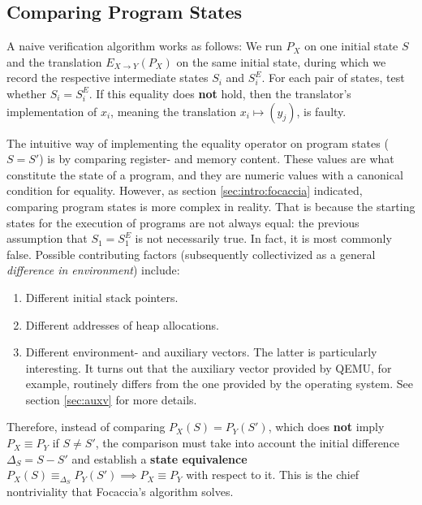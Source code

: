 \subsection{Comparing Program States}\label{sec:comparison}

A naive verification algorithm works as follows: We run $P_X$ on one initial state $S$ and the translation $E_{X
\rightarrow Y}(P_X)$ on the same initial state, during which we record the respective intermediate states $S_i$ and
$S^E_i$. For each pair of states, test whether $S_i = S^E_i$. If this equality does \textbf{not} hold, then the
translator's implementation of $x_i$, meaning the translation $x_i \mapsto (y_j)$, is faulty.

The intuitive way of implementing the equality operator on program states ($S = S'$) is by comparing register- and
memory content. These values are what constitute the state of a program, and they are numeric values with a canonical
condition for equality. However, as section \ref{sec:intro:focaccia} indicated, comparing program states is more complex
in reality. That is because the starting states for the execution of programs are not always equal: the previous
assumption that $S_1 = S^E_1$ is not necessarily true. In fact, it is most commonly false. Possible contributing factors
(subsequently collectivized as a general \textit{difference in environment}) include:

\begin{enumerate}
    \item Different initial stack pointers.
    \item Different addresses of heap allocations.
    \item Different environment- and auxiliary vectors. The latter is particularly interesting. It turns out that
        the auxiliary vector provided by QEMU, for example, routinely differs from the one provided by the operating
        system. See section \ref{sec:auxv} for more details.
\end{enumerate}

Therefore, instead of comparing $P_X(S) = P_Y(S')$, which does \textbf{not} imply $P_X \equiv P_Y$ if $S \neq S'$, the
comparison must take into account the initial difference $\Delta_S = S - S'$ and establish a \textbf{state equivalence}
$P_X(S) \equiv_{\Delta_S} P_Y(S') \implies P_X \equiv P_Y$ with respect to it. This is the chief nontriviality that
Focaccia's algorithm solves.


